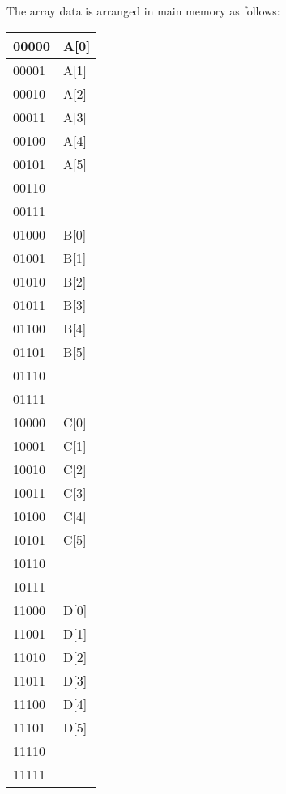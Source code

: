 \documentclass[addpoints]{exam}
\begin{document}
\begin{sloppypar}
\begin{questions}
    The array data is arranged in main memory as follows:

    \begin{tabular}{|l |l |}
        \hline 00000 \hspace*{8mm} & A[0] \hspace*{10mm} \\ \hline
        00001 & A[1] \\ \hline 
        00010 & A[2] \\ \hline
        00011 & A[3] \\ \hline
        00100 & A[4] \\ \hline
        00101 & A[5] \\ \hline
        00110 &  \\ \hline
        00111 &  \\ \hline
        01000 & B[0] \\ \hline
        01001 & B[1] \\ \hline
        01010 & B[2] \\ \hline
        01011 & B[3] \\ \hline
        01100 & B[4] \\ \hline
        01101 & B[5] \\ \hline
        01110 & \\ \hline
        01111 & \\ \hline
        10000 & C[0] \\ \hline
        10001 & C[1] \\ \hline
        10010 & C[2] \\ \hline
        10011 & C[3] \\ \hline
        10100 & C[4] \\ \hline
        10101 & C[5] \\ \hline
        10110 & \\ \hline
        10111 & \\ \hline
        11000 & D[0] \\ \hline
        11001 & D[1] \\ \hline
        11010 & D[2] \\ \hline
        11011 & D[3] \\ \hline
        11100 & D[4] \\ \hline
        11101 & D[5] \\ \hline
        11110 & \\ \hline
        11111 & \\ \hline
    \end{tabular}


\end{questions}
\end{sloppypar}
\end{document}
